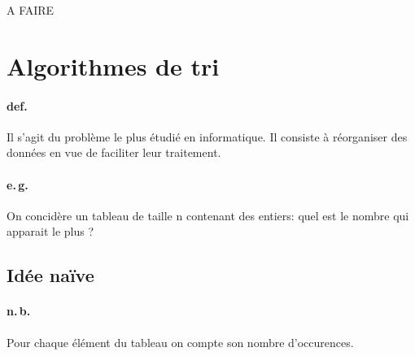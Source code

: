 \documentclass{report}
\begin{document}
    A FAIRE

  \section{Algorithmes de tri}

    \paragraph{def.} Il s'agit du problème le plus étudié en informatique. Il consiste à réorganiser des données en vue de faciliter leur traitement.

    \paragraph{e.\,g.} On concidère un tableau de taille n contenant des entiers: quel est le nombre qui apparait le plus ?

    \subsection{Idée naïve}

    \paragraph{n.\,b.} Pour chaque élément du tableau on compte son nombre d'occurences.
\end{document}
